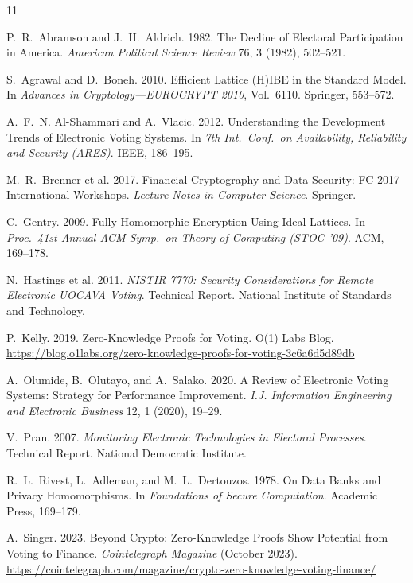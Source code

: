 \documentclass[sigconf,nonacm]{acmart}
\begin{document}
\sloppy

\begin{thebibliography}{11}

P.~R.~Abramson and J.~H.~Aldrich. 1982. The Decline of Electoral Participation in
America. \textit{American Political Science Review} 76, 3 (1982), 502--521.

S.~Agrawal and D.~Boneh. 2010. Efficient Lattice (H)IBE in the Standard Model. In
\textit{Advances in Cryptology---EUROCRYPT 2010}, Vol.~6110. Springer, 553--572.

A.~F.~N. Al-Shammari and A.~Vlacic. 2012. Understanding the Development Trends of
Electronic Voting Systems. In \textit{7th Int.\ Conf.\ on Availability, Reliability and
Security (ARES)}. IEEE, 186--195.

M.~R.~Brenner et al. 2017. Financial Cryptography and Data Security: FC 2017
International Workshops. \textit{Lecture Notes in Computer Science}. Springer.

C.~Gentry. 2009. Fully Homomorphic Encryption Using Ideal Lattices. In \textit{Proc.\
41st Annual ACM Symp.\ on Theory of Computing (STOC '09)}. ACM, 169--178.

N.~Hastings et al. 2011. \textit{NISTIR 7770: Security Considerations for Remote
Electronic UOCAVA Voting}. Technical Report. National Institute of Standards and
Technology.

P.~Kelly. 2019. Zero-Knowledge Proofs for Voting. O(1) Labs Blog.
\url{https://blog.o1labs.org/zero-knowledge-proofs-for-voting-3c6a6d5d89db}

A.~Olumide, B.~Olutayo, and A.~Salako. 2020. A Review of Electronic Voting Systems:
Strategy for Performance Improvement. \textit{I.J. Information Engineering and
Electronic Business} 12, 1 (2020), 19--29.

V.~Pran. 2007. \textit{Monitoring Electronic Technologies in Electoral Processes}.
Technical Report. National Democratic Institute.

R.~L.~Rivest, L.~Adleman, and M.~L.~Dertouzos. 1978. On Data Banks and Privacy
Homomorphisms. In \textit{Foundations of Secure Computation}. Academic Press, 169--179.

A.~Singer. 2023. Beyond Crypto: Zero-Knowledge Proofs Show Potential from Voting to
Finance. \textit{Cointelegraph Magazine} (October 2023).
\url{https://cointelegraph.com/magazine/crypto-zero-knowledge-voting-finance/}

\end{thebibliography}
\end{document}

